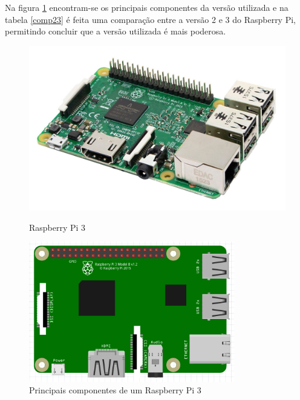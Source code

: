  Na figura \ref{comprasp1} encontram-se os principais componentes da versão utilizada e na tabela \ref{comp23} é feita uma comparação entre a versão 2 e 3 do Raspberry Pi, permitindo concluir que a versão utilizada é mais poderosa. 



\begin{figure}[h]
	\centering
	\begin{minipage}[b]{0.49\textwidth}
		\centering
		\includegraphics[width=\textwidth]{img/hardware/rasp3-img.jpg}
		\caption{Raspberry Pi 3}
		\label{rasp1}
	\end{minipage}
	\hfill
	\begin{minipage}[b]{0.49\textwidth}
		\centering
		\includegraphics[width=0.8\textwidth]{img/hardware/rasp-esquema.PNG}
		\caption{Principais componentes de um Raspberry Pi 3 }
		\label{comprasp1}
		
	\end{minipage}
\end{figure}




